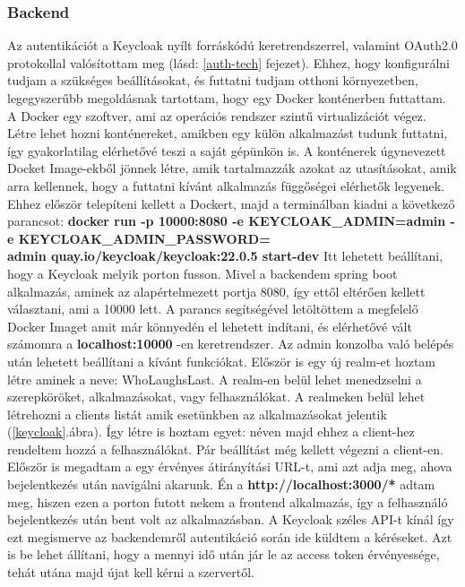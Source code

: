 \documentclass[a4paper,twoside]{article}
\begin{document}
\subsubsection{Backend}\label{auth-backend}
Az autentikációt a Keycloak nyílt forráskódú keretrendszerrel, valamint OAuth2.0 protokollal valósítottam meg (lásd: \ref{auth-tech} fejezet). Ehhez, hogy konfigurálni tudjam a 
szükséges beállításokat, és futtatni tudjam otthoni környezetben, legegyszerűbb megoldásnak tartottam, hogy egy Docker konténerben 
futtattam. A Docker egy szoftver, ami az operációs rendszer szintű virtualizációt végez. Létre lehet hozni konténereket, amikben egy külön alkalmazást tudunk futtatni, így gyakorlatilag elérhetővé teszi a saját gépünkön is. A konténerek úgynevezett Docket Image-ekből jönnek létre, amik tartalmazzák azokat az utasításokat, amik arra kellennek, hogy a futtatni kívánt alkalmazás függőségei elérhetők legyenek. Ehhez először telepíteni kellett a Dockert, majd a terminálban kiadni a következő parancsot: 
\textbf{docker run -p 10000:8080 -e KEYCLOAK\_ADMIN=admin -e KEYCLOAK\_ADMIN\_PASSWORD=\\admin quay.io/keycloak/keycloak:22.0.5 start-dev}
Itt lehetett beállítani, hogy a Keycloak melyik porton fusson. Mivel a backendem spring boot alkalmazás, aminek az alapértelmezett portja 8080, így 
ettől eltérően kellett választani, ami a 10000 lett. A parancs segítségével letöltöttem a megfelelő Docker Imaget amit már könnyedén el lehetett indítani,
és elérhetővé vált számomra a \textbf{localhost:10000} -en keretrendszer. Az admin konzolba való belépés után lehetett beállítani a kívánt funkciókat. 
Először is egy új realm-et hoztam létre aminek a neve: WhoLaughsLast. A realm-en belül lehet menedzselni a szerepköröket, alkalmazásokat, vagy felhasználókat. A realmeken belül lehet létrehozni a clients listát amik esetünkben az alkalmazásokat jelentik (\ref{keycloak}.ábra). Így létre is hoztam egyet:  néven majd ehhez a client-hez rendeltem hozzá a felhasználókat. 
Pár beállítást még kellett végezni a client-en. Először is megadtam a egy érvényes átirányítási URL-t, ami azt adja meg, ahova bejelentkezés után navigálni akarunk. Én 
a \textbf{http://localhost:3000/*} adtam meg, hiszen ezen a porton futott nekem a frontend alkalmazás, így a felhasználó bejelentkezés után bent volt az alkalmazásban. A Keycloak
széles API-t kínál így ezt megismerve az backendemről autentikáció során ide küldtem a kéréseket. Azt is be lehet állítani, hogy a mennyi idő után jár le az access token érvényessége, tehát utána majd újat kell kérni a szervertől. 
\end{document}
